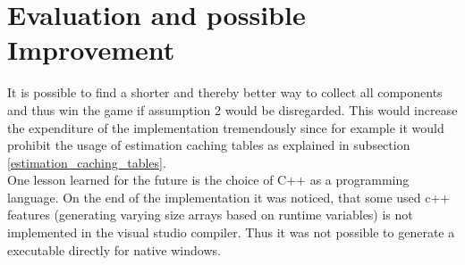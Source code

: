 \documentclass{article}
\begin{document}
\section{Evaluation and possible Improvement}
It is possible to find a shorter and thereby better way to collect all components and thus win the game if assumption 2 would be disregarded. 
This would increase the expenditure of the implementation tremendously since for example it would prohibit the usage of estimation caching tables as explained in subsection \ref{estimation_caching_tables}.\\
One lesson learned for the future is the choice of C++ as a programming language. 
On the end of the implementation it was noticed, that some used c++ features (generating varying size arrays based on runtime variables) is not implemented in the visual studio compiler. Thus it was not possible to generate a executable directly for native windows.
\end{document}
